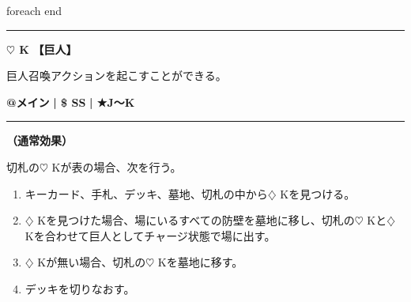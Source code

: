 \documentclass[twocolumn,a5paper,papersize,10pt]{jarticle}
\begin{document}
\vspace{-1zh}
 foreach end
 

\vspace{3mm} %
\hrule height 0.5mm depth 0mm width 66.5mm %
\vspace{1mm} %
{\Large\bf $\heartsuit$ K} {\normalsize\bf【巨人】} %
\vspace{1mm} %

巨人召喚アクションを起こすことができる。

\begin{tcolorbox}[title={\small\bf【Action】巨人召喚}{\scriptsize （召喚）}]

{\scriptsize\bf @メイン }
  {\scriptsize\bf | \$ SS }
  {\scriptsize\bf | ★J〜K}

\vspace{1mm} %
\hrule height 0.1mm depth 0mm width 62mm %
\vspace{1mm} %

{\bf（通常効果）}

切札の{\normalsize $\heartsuit$} Kが表の場合、次を行う。


\vspace{-1zh}%
\begin{enumerate}
\setlength{\leftskip}{-0.3cm}
\setlength{\parskip}{0pt} %

\item キーカード、手札、デッキ、墓地、切札の中から{\normalsize $\diamondsuit$} Kを見つける。

\item {\normalsize $\diamondsuit$} Kを見つけた場合、場にいるすべての防壁を墓地に移し、切札の{\normalsize $\heartsuit$} Kと{\normalsize $\diamondsuit$} Kを合わせて巨人としてチャージ状態で場に出す。

\item {\normalsize $\diamondsuit$} Kが無い場合、切札の{\normalsize $\heartsuit$} Kを墓地に移す。

\item デッキを切りなおす。
\vspace{-1zh}%
\end{enumerate}

\vspace{1mm} %
\end{tcolorbox}

\vspace{-1zh}
  
\end{document}

